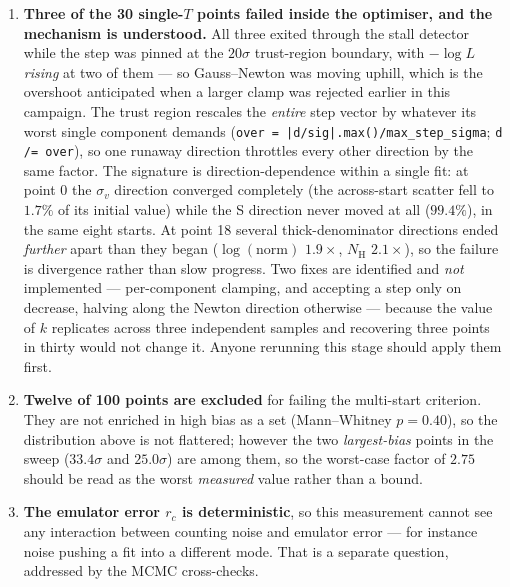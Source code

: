 \documentclass[11pt,a4paper]{article}
\newcommand{\nh}{N_{\mathrm{H}}}
\newcommand{\code}[1]{\texttt{#1}}
\begin{document}
\begin{enumerate}
$|b_{\rm sys}|>\max(3\,\code{se\_delta},\,0.5\sigma)$, and
\code{convergence\_verdict} judges drift and spread against
$\max(\text{bias},1\sigma)$, which also subsumes the vacuous-convergence guard
of the previous caveat. On the single-$T$ run the new rule reports 3 points not
converged where the old reported 9, with no indeterminate cases, and tightens
\code{measurable} from $347/360$ to $301/360$. \emph{The jsonl files on disk
were written by the old code}, so their \code{measurable} and \code{converged}
fields are the old ones; every number quoted in Sec.~\ref{sec:kwide} and
Sec.~\ref{sec:kdem} comes from applying the current rule downstream of the
stored \code{b\_sys}, \code{sigma}, \code{drift\_sigma} and
\code{start\_spread\_sigma}.
\item \textbf{Three of the 30 single-$T$ points failed inside the optimiser,
and the mechanism is understood.} All three exited through the stall detector
while the step was pinned at the $20\sigma$ trust-region boundary, with
$-\log L$ \emph{rising} at two of them --- so Gauss--Newton was moving uphill,
which is the overshoot anticipated when a larger clamp was rejected earlier in
this campaign. The trust region rescales the \emph{entire} step vector by
whatever its worst single component demands
(\code{over = |d/sig|.max()/max\_step\_sigma}; \code{d /= over}), so one
runaway direction throttles every other direction by the same factor. The
signature is direction-dependence within a single fit: at point 0 the
$\sigma_v$ direction converged completely (the across-start scatter fell to
$1.7\%$ of its initial value) while the S direction never moved at all
($99.4\%$), in the same eight starts. At point 18 several thick-denominator
directions ended \emph{further} apart than they began
($\log(\text{norm})$ $1.9\times$, $\nh$ $2.1\times$), so the failure is
divergence rather than slow progress. Two fixes are identified and
\emph{not} implemented --- per-component clamping, and accepting a step only on
decrease, halving along the Newton direction otherwise --- because the value of
$k$ replicates across three independent samples and recovering three points in
thirty would not change it. Anyone rerunning this stage should apply them
first.
\item \textbf{Twelve of 100 points are excluded} for failing the multi-start
criterion. They are not enriched in high bias as a set (Mann--Whitney
$p=0.40$), so the distribution above is not flattered; however the two
\emph{largest-bias} points in the sweep ($33.4\sigma$ and $25.0\sigma$) are
among them, so the worst-case factor of $2.75$ should be read as the worst
\emph{measured} value rather than a bound.
\item \textbf{The emulator error $r_c$ is deterministic}, so this measurement
cannot see any interaction between counting noise and emulator error --- for
instance noise pushing a fit into a different mode. That is a separate
question, addressed by the MCMC cross-checks.
\end{enumerate}
\end{document}
